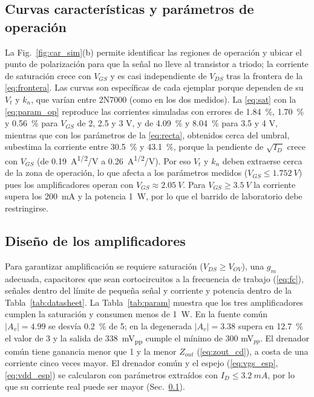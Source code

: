 \documentclass[conference]{IEEEtran}
\newcommand{\gm}{g_m}
\newcommand{\kn}{k_n}
\newcommand{\Vov}{V_{OV}}
\begin{document}
\subsection{Curvas características y parámetros de operación}
\label{sec:an_curvas}
La Fig.~\ref{fig:car_sim}(b) permite identificar las regiones de operación y ubicar el punto de polarización para que la señal no lleve al transistor a triodo; la corriente de saturación crece con $V_{GS}$ y es casi independiente de $V_{DS}$ tras la frontera de la \eqref{eq:frontera}. Las curvas son específicas de cada ejemplar porque dependen de su $V_t$ y $\kn$, que varían entre 2N7000 (como en los dos medidos). La \eqref{eq:sat} con la \eqref{eq:param_op} reproduce las corrientes simuladas con errores de \SI{1.84}{\percent}, \SI{1.70}{\percent} y \SI{0.56}{\percent} para $V_{GS}$ de 2, 2.5 y 3 V, y de \SI{4.09}{\percent} y \SI{8.04}{\percent} para 3.5 y 4 V, mientras que con los parámetros de la \eqref{eq:recta}, obtenidos cerca del umbral, subestima la corriente entre \SI{30.5}{\percent} y \SI{43.1}{\percent}, porque la pendiente de $\sqrt{I_D}$ crece con $V_{GS}$ (de \SI{0.19}{A^{1/2}/V} a \SI{0.26}{A^{1/2}/V}). Por eso $V_t$ y $\kn$ deben extraerse cerca de la zona de operación, lo que afecta a los parámetros medidos ($V_{GS}\le\SI{1.752}{V}$) pues los amplificadores operan con $V_{GS}\approx\SI{2.05}{V}$. Para $V_{GS}\ge\SI{3.5}{V}$ la corriente supera los \SI{200}{mA} y la potencia \SI{1}{W}, por lo que el barrido de laboratorio debe restringirse.

\subsection{Diseño de los amplificadores}
\label{sec:an_dis}
Para garantizar amplificación se requiere saturación ($V_{DS}\ge\Vov$), una $\gm$ adecuada, capacitores que sean cortocircuitos a la frecuencia de trabajo (\eqref{eq:fc}), señales dentro del límite de pequeña señal y corriente y potencia dentro de la Tabla~\ref{tab:datasheet}. La Tabla~\ref{tab:param} muestra que los tres amplificadores cumplen la saturación y consumen menos de \SI{1}{W}. En la fuente común $|A_v|=4.99$ se desvía \SI{0.2}{\percent} de 5; en la degenerada $|A_v|=3.38$ supera en \SI{12.7}{\percent} el valor de 3 y la salida de \SI{338}{mV_{pp}} cumple el mínimo de 300 mV$_{pp}$. El drenador común tiene ganancia menor que 1 y la menor $Z_{out}$ (\eqref{eq:zout_cd}), a costa de una corriente cinco veces mayor. El drenador común y el espejo (\eqref{eq:vgs_esp}, \eqref{eq:vdd_esp}) se calcularon con parámetros extraídos con $I_D\le\SI{3.2}{mA}$, por lo que su corriente real puede ser mayor (Sec.~\ref{sec:an_curvas}).
\end{document}
